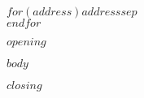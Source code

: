 \documentclass[
    a4paper,
    parskip=half,
    firstfoot=false,
    enlargefirstpage,
    foldmarks=$foldmarks$]{scrlttr2}
\begin{document}
    \begin{letter}{$for(address)$$address$$sep$\\$endfor$}
        \opening{$opening$}
        $body$
        \closing{$closing$}
    \end{letter}
\end{document}

